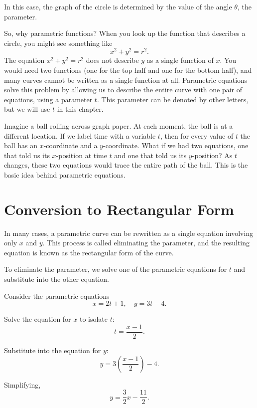 In this case, the graph of the circle is determined by the value of the angle $\theta$, the parameter.

So, why parametric functions? When you look up the function that describes a circle, you might see something like
\begin{equation*}
    x^2 + y^2 = r^2.
\end{equation*}
The equation $x^2 + y^2 = r^2$ does not describe $y$ as a single function of $x$. You would need two functions (one for the top half and one for the bottom half), and many curves cannot be written as a single function at all. Parametric equations solve this problem by allowing us to describe the entire curve with one pair of equations, using a parameter $t$. This parameter can be denoted by other letters, but we will use $t$ in this chapter.

Imagine a ball rolling across graph paper. At each moment, the ball is at a different location. If we label time with a variable $t$, then for every value of $t$ the ball has an $x$-coordinate and a $y$-coordinate. What if we had two equations, one that told us its $x$-position at time $t$ and one that told us its $y$-position? As $t$ changes, these two equations would trace the entire path of the ball. This is the basic idea behind parametric equations.

\section{Conversion to Rectangular Form}

In many cases, a parametric curve can be rewritten as a single equation
involving only $x$ and $y$. This process is called eliminating the
parameter, and the resulting equation is known as the rectangular
form of the curve.

To eliminate the parameter, we solve one of the parametric equations for
$t$ and substitute into the other equation.

\begin{Worked}
\begin{Problem}
Consider the parametric equations
\begin{equation*}
    x = 2t + 1, \quad y = 3t - 4.
\end{equation*}
\end{Problem}
\begin{Solution}
Solve the equation for $x$ to isolate $t$:
\begin{equation*}
    t = \frac{x - 1}{2}.
\end{equation*}

Substitute into the equation for $y$:
\begin{equation*}
    y = 3\left(\frac{x - 1}{2}\right) - 4.
\end{equation*}

Simplifying,
\begin{equation*}
    y = \frac{3}{2}x - \frac{11}{2}.
\end{equation*}
\end{Solution}
\end{Worked}

